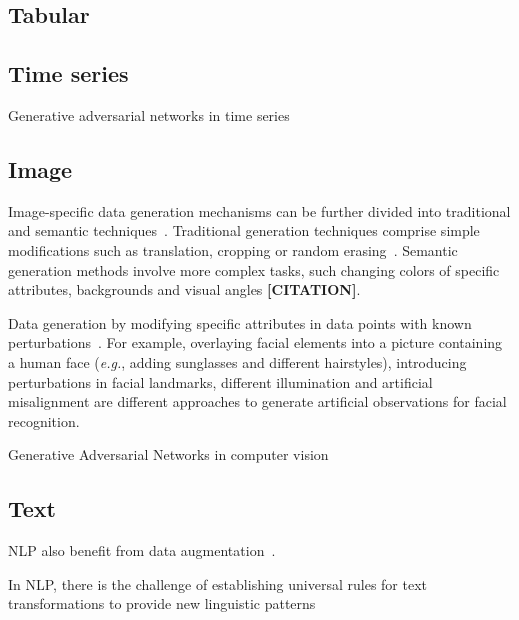 \documentclass[parskip=full]{scrartcl}
\begin{document}
\subsection{Tabular}

\subsection{Time series}

Generative adversarial networks in time series 

\subsection{Image}

Image-specific data generation mechanisms can be further divided into
traditional and semantic techniques~\cite{wang2021regularizing}. Traditional
generation techniques comprise simple modifications such as translation,
cropping or random erasing~\cite{zhong2017random}. Semantic generation methods
involve more complex tasks, such changing colors of specific attributes,
backgrounds and visual angles \textbf{[CITATION]}. 

Data generation by modifying specific attributes in data points with known
perturbations~\cite{lv2017data}. For example, overlaying facial elements into
a picture containing a human face (\textit{e.g.}, adding sunglasses and
different hairstyles), introducing perturbations in facial landmarks,
different illumination and artificial misalignment are different approaches to
generate artificial observations for facial recognition.

Generative Adversarial Networks in computer vision~\cite{wang2021generative}


\subsection{Text}

NLP also benefit from data augmentation~\cite{feng2021survey}.

In NLP, there is the challenge of establishing universal rules for text
transformations to provide new linguistic patterns~\cite{bayer2022data}
\end{document}
